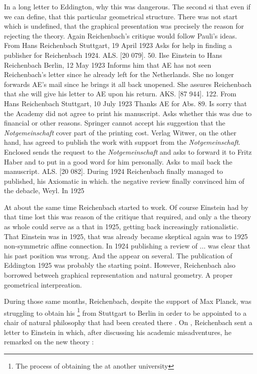 \documentclass[draft]{article}
\begin{document}
In a long letter to Eddington, why this was dangerous. The second si that even if we can define, that this particular geometrical structure. There was not start which is undefined, that the graphical presentation was precisely the reason for rejecting the theory. Again Reichenbach's critique would follow Pauli's ideas. From Hans Reichenbach Stuttgart, 19 April 1923 Asks for help in finding a publisher for Reichenbach 1924. ALS. [20 079]. 50. Ilse Einstein to Hans Reichenbach Berlin, 12 May 1923 Informs him that AE has not seen Reichenbach’s letter since he already left for the Netherlands. She no longer forwards AE’s mail since he brings it all back unopened. She assures Reichenbach that she will give his letter to AE upon his return. AKS. [87 944]. 122. From Hans Reichenbach Stuttgart, 10 July 1923 Thanks AE for Abs. 89. Is sorry that the Academy did not agree to print his manuscript. Asks whether this was due to financial or other reasons. Springer cannot accept his suggestion that the \textit{Notgemeinschaft} cover part of the printing cost. Verlag Witwer, on the other hand, has agreed to publish the work with support from the \textit{Notgemeinschaft}. Enclosed sends the request to the \textit{Notgemeinschaft} and asks to forward it to Fritz Haber and to put in a good word for him personally. Asks to mail back the manuscript. ALS. [20 082]. During 1924 Reichenbach finally managed to published, his Axiomatic in which. the negative review finally convinced him of the debacle, Weyl. In 1925

At about the same time Reichenbach started to work. Of course Einstein had by that time lost this was reason of the critique that required, and only a the theory as whole could serve as a that in 1925, getting back increasingly rationalistic. That Einstein was in 1925, that was already became skeptical again was to 1925 non-symmetric affine connection. In 1924 publishing a review of ... was clear that his past position was wrong. And the appear on several. The publication of Eddington 1925 was probably the starting point. However, Reichenbach also borrowed betweeh graphical representation and natural geometry. A proper geometrical interpreation.

During those same months, Reichenbach, despite the support of Max Planck, was struggling to obtain his \footnote{The process of obtaining the  at another university} from Stuttgart to Berlin in order to be appointed to a chair of natural philosophy that had been created there \citep{Hecht1982}. On , Reichenbach sent a letter to Einstein in which, after discussing his academic misadventures, he remarked on the new  theory \citep{Einstein1925a}:
\end{document}
